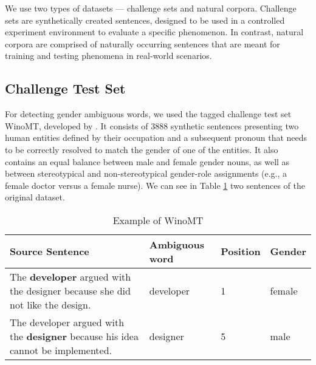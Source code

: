 
We use two types of datasets — challenge sets and natural corpora. Challenge sets are synthetically created sentences, designed to be used in a controlled experiment environment to evaluate a specific phenomenon. In contrast, natural corpora are comprised of naturally occurring sentences that are meant for training and testing phenomena in real-world scenarios.

\subsection{Challenge Test Set}
\label{sec:Experiments:Challenge_Set}

For detecting gender ambiguous words, we used the tagged challenge test set WinoMT, developed by \citet{Stanovsky_2019}. It consists of 3888 synthetic sentences presenting two human entities defined by their occupation and a subsequent pronoun that needs to be correctly resolved to match the gender of one of the entities. It also contains an equal balance between male and female gender nouns, as well as between stereotypical and non-stereotypical gender-role assignments (e.g., a female doctor versus a female nurse). We can see in Table \ref{tab:winomt} two sentences of the original dataset.


\begin{table}
    \caption{Example of WinoMT}
    \label{tab:winomt}
    \begin{tabularx}{\linewidth}{|X|l|l|l|}
        \hline
        \textbf{Source Sentence} & \textbf{Ambiguous word} & \textbf{Position} & \textbf{Gender} \\ \hline
        The \textbf{developer} argued with the designer because she did not like the design. & developer & 1 & female \\ \hline
        The developer argued with the \textbf{designer} because his idea cannot be implemented. & designer & 5 & male \\ \hline
    \end{tabularx}
\end{table}

